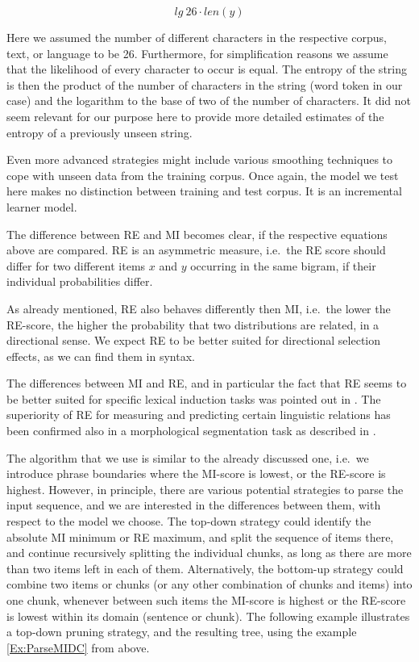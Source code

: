 \documentclass[11pt,a4paper,english]{article}
\begin{document}
\begin{equation}
lg~26 \cdot len(y)
\end{equation}

Here we assumed the number of different characters in the respective corpus, text, or language to be 26. Furthermore, for simplification reasons we assume that the likelihood of every character to occur is equal. The entropy of the string is then the product of the number of characters in the string (word token in our case) and the logarithm to the base of two of the number of characters. It did not seem relevant for our purpose here to provide more detailed estimates of the entropy of a previously unseen string.

Even more advanced strategies might include various smoothing techniques to cope with unseen data from the training corpus. Once again, the model we test here makes no distinction between training and test corpus. It is an incremental learner model.

The difference between RE and MI becomes clear, if the respective equations above are compared. RE is an asymmetric measure, i.e.\ the RE score should differ for two different items $x$ and $y$ occurring in the same bigram, if their individual probabilities differ.

As already mentioned, RE also behaves differently then MI, i.e.\ the lower the RE-score, the higher the probability that two distributions are related, in a directional sense. We expect RE to be better suited for directional selection effects, as we can find them in syntax.

The differences between MI and RE, and in particular the fact that RE seems to be better suited for specific lexical induction tasks was pointed out in \cite{Lee:1997}. The superiority of RE for measuring and predicting certain linguistic relations has been confirmed also in a morphological segmentation task as described in \cite{Cavar:ea:2004b}.

The algorithm that we use is similar to the already discussed one, i.e.\ we introduce phrase boundaries where the MI-score is lowest, or the RE-score is highest. However, in principle, there are various potential strategies to parse the input sequence, and we are interested in the differences between them, with respect to the model we choose. The top-down strategy could identify the absolute MI minimum or RE maximum, and split the sequence of items there, and continue recursively splitting the individual chunks, as long as there are more than two items left in each of them. Alternatively, the bottom-up strategy could combine two items or chunks (or any other combination of chunks and items) into one chunk, whenever between such items the  MI-score is highest or the RE-score is lowest within its domain (sentence or chunk). The following example illustrates a top-down pruning strategy, and the resulting tree, using the example \ref{Ex:ParseMIDC} from above.
\end{document}
